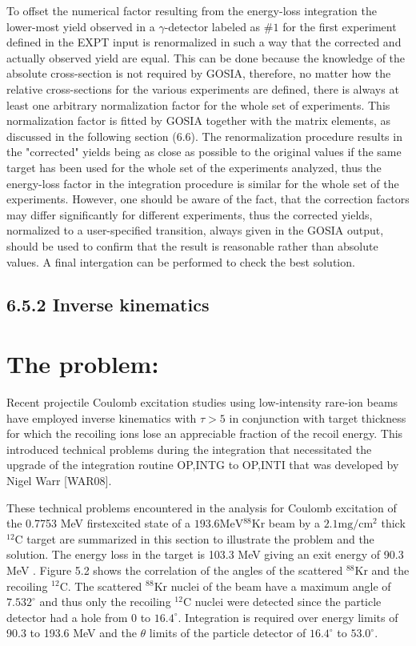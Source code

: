 \documentclass[10pt]{article}
\begin{document}
To offset the numerical factor resulting from the energy-loss integration the lower-most yield observed in a $\gamma$-detector labeled as $\# 1$ for the first experiment defined in the EXPT input is renormalized in such a way that the corrected and actually observed yield are equal. This can be done because the knowledge of the absolute cross-section is not required by GOSIA, therefore, no matter how the relative cross-sections for the various experiments are defined, there is always at least one arbitrary normalization factor for the whole set of experiments. This normalization factor is fitted by GOSIA together with the matrix elements, as discussed in the following section (6.6). The renormalization procedure results in the "corrected" yields being as close as possible to the original values if the same target has been used for the whole set of the experiments analyzed, thus the energy-loss factor in the integration procedure is similar for the whole set of the experiments. However, one should be aware of the fact, that the correction factors may differ significantly for different experiments, thus the corrected yields, normalized to a user-specified transition, always given in the GOSIA output, should be used to confirm that the result is reasonable rather than absolute values. A final intergation can be performed to check the best solution.

\subsection*{6.5.2 Inverse kinematics}
\section*{The problem:}
Recent projectile Coulomb excitation studies using low-intensity rare-ion beams have employed inverse kinematics with $\tau>5$ in conjunction with target thickness for which the recoiling ions lose an appreciable fraction of the recoil energy. This introduced technical problems during the integration that necessitated the upgrade of the integration routine OP,INTG to OP,INTI that was developed by Nigel Warr [WAR08].

These technical problems encountered in the analysis for Coulomb excitation of the 0.7753 MeV firstexcited state of a $193.6 \mathrm{MeV}{ }^{88} \mathrm{Kr}$ beam by a $2.1 \mathrm{mg} / \mathrm{cm}^{2}$ thick ${ }^{12} \mathrm{C}$ target are summarized in this section to illustrate the problem and the solution. The energy loss in the target is 103.3 MeV giving an exit energy of 90.3 MeV . Figure 5.2 shows the correlation of the angles of the scattered ${ }^{88} \mathrm{Kr}$ and the recoiling ${ }^{12} \mathrm{C}$. The scattered ${ }^{88} \mathrm{Kr}$ nuclei of the beam have a maximum angle of $7.532^{\circ}$ and thus only the recoiling ${ }^{12} \mathrm{C}$ nuclei were detected since the particle detector had a hole from 0 to $16.4^{\circ}$. Integration is required over energy limits of 90.3 to 193.6 MeV and the $\theta$ limits of the particle detector of $16.4^{\circ}$ to $53.0^{\circ}$.
\end{document}
